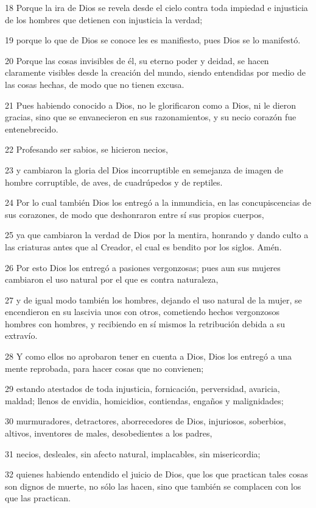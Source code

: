 \par 18 Porque la ira de Dios se revela desde el cielo contra toda impiedad e injusticia de los hombres que detienen con injusticia la verdad;
\par 19 porque lo que de Dios se conoce les es manifiesto, pues Dios se lo manifestó.
\par 20 Porque las cosas invisibles de él, su eterno poder y deidad, se hacen claramente visibles desde la creación del mundo, siendo entendidas por medio de las cosas hechas, de modo que no tienen excusa.
\par 21 Pues habiendo conocido a Dios, no le glorificaron como a Dios, ni le dieron gracias, sino que se envanecieron en sus razonamientos, y su necio corazón fue entenebrecido.
\par 22 Profesando ser sabios, se hicieron necios,
\par 23 y cambiaron la gloria del Dios incorruptible en semejanza de imagen de hombre corruptible, de aves, de cuadrúpedos y de reptiles.
\par 24 Por lo cual también Dios los entregó a la inmundicia, en las concupiscencias de sus corazones, de modo que deshonraron entre sí sus propios cuerpos,
\par 25 ya que cambiaron la verdad de Dios por la mentira, honrando y dando culto a las criaturas antes que al Creador, el cual es bendito por los siglos. Amén.
\par 26 Por esto Dios los entregó a pasiones vergonzosas; pues aun sus mujeres cambiaron el uso natural por el que es contra naturaleza,
\par 27 y de igual modo también los hombres, dejando el uso natural de la mujer, se encendieron en su lascivia unos con otros, cometiendo hechos vergonzosos hombres con hombres, y recibiendo en sí mismos la retribución debida a su extravío.
\par 28 Y como ellos no aprobaron tener en cuenta a Dios, Dios los entregó a una mente reprobada, para hacer cosas que no convienen;
\par 29 estando atestados de toda injusticia, fornicación, perversidad, avaricia, maldad; llenos de envidia, homicidios, contiendas, engaños y malignidades;
\par 30 murmuradores, detractores, aborrecedores de Dios, injuriosos, soberbios, altivos, inventores de males, desobedientes a los padres,
\par 31 necios, desleales, sin afecto natural, implacables, sin misericordia;
\par 32 quienes habiendo entendido el juicio de Dios, que los que practican tales cosas son dignos de muerte, no sólo las hacen, sino que también se complacen con los que las practican.

